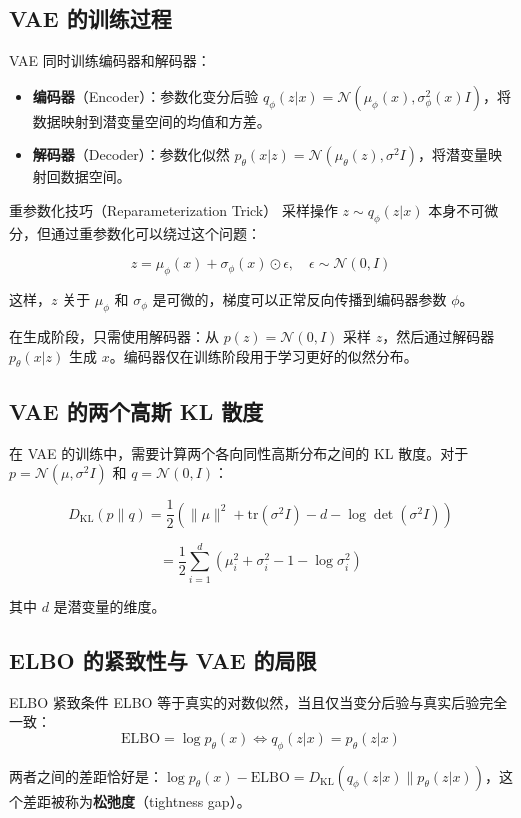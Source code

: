 \subsection{VAE 的训练过程}

VAE 同时训练编码器和解码器：

\begin{itemize}
    \item \textbf{编码器}（Encoder）：参数化变分后验 $q_\phi(z|x) = \mathcal{N}(\mu_\phi(x), \sigma^2_\phi(x) I)$，将数据映射到潜变量空间的均值和方差。
    \item \textbf{解码器}（Decoder）：参数化似然 $p_\theta(x|z) = \mathcal{N}(\mu_\theta(z), \sigma^2 I)$，将潜变量映射回数据空间。
\end{itemize}

\begin{knowledgebox}{重参数化技巧（Reparameterization Trick）}
采样操作 $z \sim q_\phi(z|x)$ 本身不可微分，但通过重参数化可以绕过这个问题：

$$z = \mu_\phi(x) + \sigma_\phi(x) \odot \epsilon, \quad \epsilon \sim \mathcal{N}(0, I)$$

这样，$z$ 关于 $\mu_\phi$ 和 $\sigma_\phi$ 是可微的，梯度可以正常反向传播到编码器参数 $\phi$。
\end{knowledgebox}

在生成阶段，只需使用解码器：从 $p(z) = \mathcal{N}(0, I)$ 采样 $z$，然后通过解码器 $p_\theta(x|z)$ 生成 $x$。编码器仅在训练阶段用于学习更好的似然分布。

\subsection{VAE 的两个高斯 KL 散度}

在 VAE 的训练中，需要计算两个各向同性高斯分布之间的 KL 散度。对于 $p = \mathcal{N}(\mu, \sigma^2 I)$ 和 $q = \mathcal{N}(0, I)$：

$$D_{\text{KL}}(p \| q) = \frac{1}{2} \left( \|\mu\|^2 + \text{tr}(\sigma^2 I) - d - \log \det(\sigma^2 I) \right)$$

$$= \frac{1}{2} \sum_{i=1}^{d} \left( \mu_i^2 + \sigma_i^2 - 1 - \log \sigma_i^2 \right)$$

其中 $d$ 是潜变量的维度。

\subsection{ELBO 的紧致性与 VAE 的局限}

\begin{importantbox}{ELBO 紧致条件}
ELBO 等于真实的对数似然，当且仅当变分后验与真实后验完全一致：
$$\text{ELBO} = \log p_\theta(x) \iff q_\phi(z|x) = p_\theta(z|x)$$

两者之间的差距恰好是：$\log p_\theta(x) - \text{ELBO} = D_{\text{KL}}(q_\phi(z|x) \| p_\theta(z|x))$，这个差距被称为\textbf{松弛度}（tightness gap）。
\end{importantbox}

